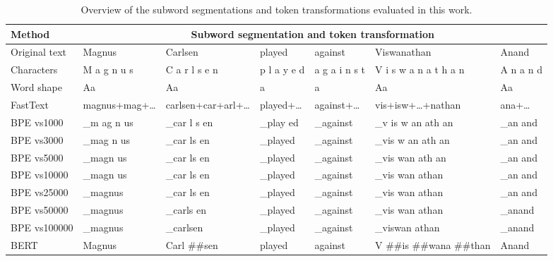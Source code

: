 \documentclass[11pt,a4paper]{article}
\begin{document}
\begin{table*}[!htbp]
	\centering
	\small
	\begin{adjustbox}{max width=\linewidth}
		\begin{tabular}{l|llllll}
			\toprule
			Method & \multicolumn{6}{c}{Subword segmentation and token transformation}\\
			\midrule
			Original text & Magnus & Carlsen & played & against & Viswanathan & Anand \\
			\rule{0pt}{10pt}Characters & M a g n u s & C a r l s e n & p l a y e d & a g a i n s t & V i s w a n a t h a n & A n a n d \\
			Word shape & Aa & Aa & a & a & Aa & Aa \\
			\rule{0pt}{10pt}FastText & magnus+mag+\ldots & carlsen+car+arl+\ldots & played+\ldots & against+\ldots & vis+isw+\ldots+nathan & ana+\ldots \\
			\rule{0pt}{10pt}BPE vs1000 & \_m ag n us & \_car l s en & \_play ed & \_against & \_v is w an ath an & \_an and \\
			BPE vs3000 & \_mag n us & \_car ls en & \_played & \_against & \_vis w an ath an & \_an and \\
			BPE vs5000 & \_magn us & \_car ls en & \_played & \_against & \_vis wan ath an & \_an and \\
			BPE vs10000 & \_magn us & \_car ls en & \_played & \_against & \_vis wan athan & \_an and \\
			BPE vs25000 & \_magnus & \_car ls en & \_played & \_against & \_vis wan athan & \_an and \\
			BPE vs50000 & \_magnus & \_carls en & \_played & \_against & \_vis wan athan & \_anand \\
			BPE vs100000 & \_magnus & \_carlsen & \_played & \_against & \_viswan athan & \_anand \\
			\rule{0pt}{10pt}BERT & Magnus & Carl \#\#sen & played & against & V \#\#is \#\#wana \#\#than & Anand \\
			\bottomrule
		\end{tabular}
	\end{adjustbox}
	\caption{Overview of the subword segmentations and token transformations evaluated in this work.}
	\label{tbl:subword-examples}
\end{table*}
\end{document}
